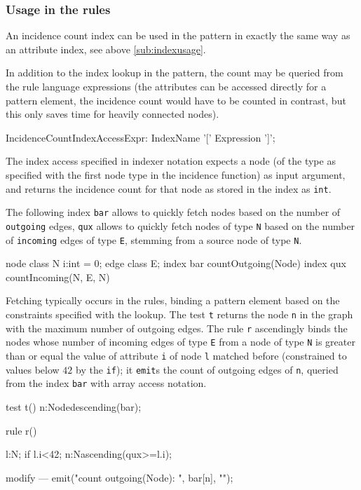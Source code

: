 \subsubsection*{Usage in the rules}
An incidence count index can be used in the pattern in exactly the same way as an attribute index, see above \ref{sub:indexusage}.

In addition to the index lookup in the pattern, 
the count may be queried from the rule language expressions (the attributes can be accessed directly for a pattern element, the incidence count would have to be counted in contrast, but this only saves time for heavily connected nodes).

\begin{rail}
  IncidenceCountIndexAccessExpr:
    IndexName '[' Expression ']';
\end{rail}

The index access specified in indexer notation expects a node (of the type as specified with the first node type in the incidence function) as input argument, and returns the incidence count for that node as stored in the index as \texttt{int}.

\begin{example}
The following index \texttt{bar} allows to quickly fetch nodes based on the number of \texttt{outgoing} edges, \texttt{qux} allows to quickly fetch nodes of type \texttt{N} based on the number of \texttt{incoming} edges of type \texttt{E}, stemming from a source node of type \texttt{N}.

\begin{grgen}
node class N {
	i:int = 0;
}
edge class E;
index bar { countOutgoing(Node) }
index qux { countIncoming(N, E, N) }
\end{grgen}

Fetching typically occurs in the rules, binding a pattern element based on the constraints specified with the lookup.
The test \texttt{t} returns the node \texttt{n} in the graph with the maximum number of outgoing edges.
The rule \texttt{r} ascendingly binds the nodes whose number of incoming edges of type \texttt{E} from a node of type \texttt{N} is greater than or equal the value of attribute \texttt{i} of node \texttt{l} matched before (constrained to values below $42$ by the \texttt{if}); it \texttt{emit}s the count of outgoing edges of \texttt{n}, queried from the index \texttt{bar} with array access notation.

\begin{grgen}
test t() {
	n:Node{descending(bar)};
}

rule r() {
  l:N; if{ l.i<42;}
  n:N{ascending(qux>=l.i)};
	
  modify {
  ---
    emit("count outgoing(Node): ", bar[n], "\n");
  }
}
\end{grgen}

\end{example}

